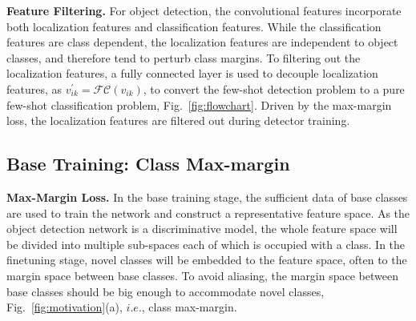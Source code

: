 \documentclass[final]{cvpr}
\begin{document}
\textbf{Feature Filtering.} For object detection, the convolutional features incorporate both localization features and classification features. While the classification features are class dependent, the localization features are independent to object classes, and therefore tend to perturb class margins. To filtering out the localization features, a fully connected layer is used to decouple localization features, as $v_{ik}^{'} = \mathcal{FC}(v_{ik})$, to convert the few-shot detection problem to a pure few-shot classification problem, Fig.\ \ref{fig:flowchart}. Driven by the max-margin loss, the localization features are filtered out during detector training.

\subsection{Base Training: Class Max-margin}

\textbf{Max-Margin Loss.}
In the base training stage, the sufficient data of base classes are used to train the network and construct a representative feature space. As the object detection network is a discriminative model, the whole feature space will be divided into multiple sub-spaces each of which is occupied with a class. 
In the finetuning stage, novel classes will be embedded to the feature space, often to the margin space between base classes. To avoid aliasing, the margin space between base classes should be big enough to accommodate novel classes, Fig.\ \ref{fig:motivation}(a), $i.e.$, class max-margin. 
\end{document}

